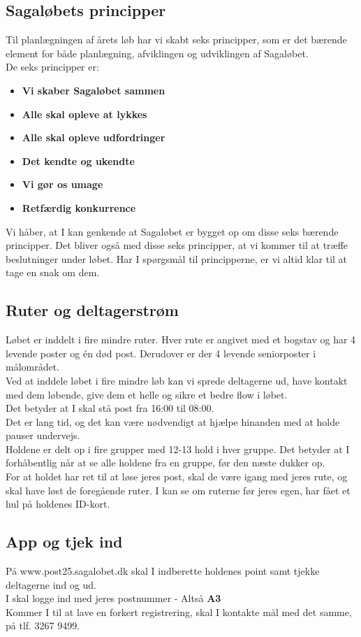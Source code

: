 \subsection{Sagaløbets principper}
Til planlægningen af årets løb har vi skabt seks principper, som er det bærende element for både planlægning, afviklingen og udviklingen af Sagaløbet.\\
De seks principper er:
\begin{itemize}
  \item \textbf{Vi skaber Sagaløbet sammen}
  \item \textbf{Alle skal opleve at lykkes}
  \item \textbf{Alle skal opleve udfordringer}
  \item \textbf{Det kendte og ukendte}
  \item \textbf{Vi gør os umage}
  \item \textbf{Retfærdig konkurrence}
\end{itemize}
Vi håber, at I kan genkende at Sagaløbet er bygget op om disse seks bærende principper. Det bliver også med disse seks principper, at vi kommer til at træffe beslutninger under løbet. Har I spørgsmål til principperne, er vi altid klar til at tage en snak om dem.
\subsection{Ruter og deltagerstrøm}
Løbet er inddelt i fire mindre ruter. Hver rute er angivet med et bogstav og har 4 levende poster og én død post. Derudover er der 4 levende seniorposter i målområdet.\\
Ved at inddele løbet i fire mindre løb kan vi sprede deltagerne ud, have kontakt med dem løbende, give dem et helle og sikre et bedre flow i løbet.\\
\newline
Det betyder at I skal stå post fra 16:00 til 08:00.\\
Det er lang tid, og det kan være nødvendigt at hjælpe hinanden med at holde pauser undervejs.\\
\newline
Holdene er delt op i fire grupper med 12-13 hold i hver gruppe. Det betyder at I forhåbentlig når at se alle holdene fra en gruppe, før den næste dukker op.\\
For at holdet har ret til at løse jeres post, skal de være igang med jeres rute, og skal have løst de foregående ruter. I kan se om ruterne før jeres egen, har fået et hul på holdenes ID-kort.
\subsection{App og tjek ind}
På www.post25.sagalobet.dk skal I indberette holdenes point samt tjekke deltagerne ind og ud.\\
I skal logge ind med jeres postnummer - Altså \textbf{A3}\\
\newline
Kommer I til at lave en forkert registrering, skal I kontakte mål med det samme, på tlf. 3267 9499.
\newpage
\vspace*{.4cm}
